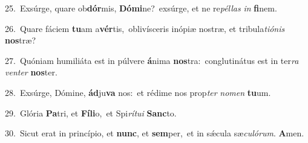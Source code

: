 {\numbfont\textcolor{\numbcolor}{25.}}~Exsúrge, quare ob\-\textbf{dór}\-mis, \textbf{Dó}\-\textbf{mi}ne?~\star exsúrge, et ne re\-\textit{pél}\-\textit{las} \textit{in} \textbf{fi}\-nem.\par
{\numbfont\textcolor{\numbcolor}{26.}}~Quare fáciem \textbf{tu}\-am a\-\textbf{vér}\-tis,~\star oblivísceris inópiæ nostræ, et tribula\-\textit{ti}\-\textit{ó}\textit{nis} \textbf{nos}\-træ?\par
{\numbfont\textcolor{\numbcolor}{27.}}~Quóniam humiliáta est in púlvere \textbf{á}\-nima \textbf{nos}\-tra:~\star conglutinátus est in ter\textit{ra} \textit{ven}\-\textit{ter} \textbf{nos}\-ter.\par
{\numbfont\textcolor{\numbcolor}{28.}}~Exsúrge, Dómine, \textbf{ád}\-ju\textbf{va} nos:~\star et rédime nos prop\textit{ter} \textit{no}\-\textit{men} \textbf{tu}\-um.\par
{\numbfont\textcolor{\numbcolor}{29.}}~Glória \textbf{Pa}\-tri, et \textbf{Fí}\-\textbf{li}o,~\star et Spi\-\textit{rí}\-\textit{tu}\textit{i} \textbf{Sanc}\-to.\par
{\numbfont\textcolor{\numbcolor}{30.}}~Sicut erat in princípio, et \textbf{nunc}\-, et \textbf{sem}\-per,~\star et in sǽcula sæ\-\textit{cu}\-\textit{ló}\textit{rum}. \textbf{A}\-men.\par
